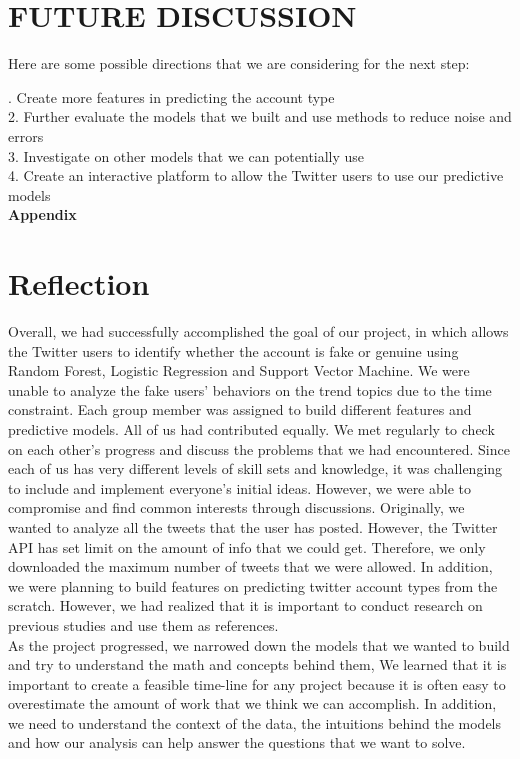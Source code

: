 \documentclass[a4paper, 12pt]{report}
\begin{document}
\section*{FUTURE DISCUSSION}
Here are some possible directions that we are considering for the next step:

. Create more features in predicting the account type\\
2. Further evaluate the models that we built and use methods to reduce noise and errors\\
3. Investigate on other models that we can potentially use\\
4. Create an interactive platform to allow the Twitter users to use our predictive models\\

\newpage
\large\textbf{Appendix} 
\section*{Reflection}
Overall, we had successfully accomplished the goal of our project, in which allows the Twitter users to identify whether the account is fake or genuine using Random Forest, Logistic Regression and Support Vector Machine. We were unable to analyze the fake users' behaviors on the trend topics due to the time constraint. Each group member was assigned to build different features and predictive models. All of us had contributed equally. We met regularly to check on each other's progress and discuss the problems that we had encountered. Since each of us has very different levels of skill sets and knowledge, it was challenging to include and implement everyone's initial ideas. However, we were able to compromise and find common interests through discussions. Originally, we wanted to analyze all the tweets that the user has posted. However, the Twitter API has set limit on the amount of info that we could get. Therefore, we only downloaded the maximum number of tweets that we were allowed. In addition, we were planning to build features on predicting twitter account types from the scratch. However, we had realized that it is important to conduct research on previous studies and use them as references. \\

\noindent As the project progressed, we narrowed down the models that we wanted to build and try to understand the math and concepts behind them, We learned that it is important to create a feasible time-line for any project because it is often easy to overestimate the amount of work that we think we can accomplish. In addition, we need to understand the context of the data, the intuitions behind the models and how our analysis can help answer the questions that we want to solve.\\
\end{document}
